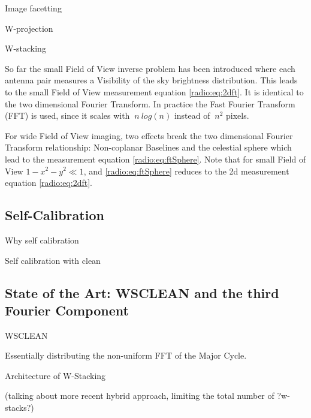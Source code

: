 Image facetting

W-projection

W-stacking

So far the small Field of View inverse problem has been introduced where each antenna pair measures a Visibility of the sky brightness distribution. This leads to the small Field of View measurement equation \eqref{radio:eq:2dft}. It is identical to the two dimensional Fourier Transform. In practice the Fast Fourier Transform (FFT) is used, since it scales with $~n\:log(n)$ instead of $~n^2$ pixels.



For wide Field of View imaging, two effects break the two dimensional Fourier Transform relationship: Non-coplanar Baselines and the celestial sphere which lead to the measurement equation \eqref{radio:eq:ftSphere}. Note that for small Field of View $1 - x^2 -y ^2 \ll 1$, and \eqref{radio:eq:ftSphere} reduces to the 2d measurement equation \eqref{radio:eq:2dft}.



\subsection{Self-Calibration}
Why self calibration

Self calibration with clean




\subsection{State of the Art: WSCLEAN and the third Fourier Component} 

\cite{offringa2014wsclean} WSCLEAN

Essentially distributing the non-uniform FFT of the Major Cycle.

Architecture of W-Stacking

(talking about more recent hybrid approach, limiting the total number of ?w-stacks?)






